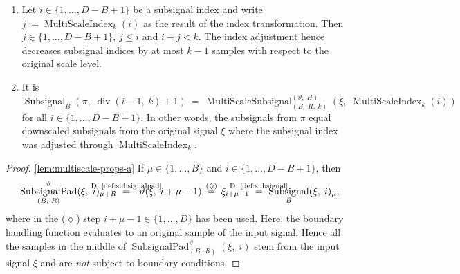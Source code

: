 \documentclass[journal]{IEEEtran}
\newcommand{\ROI}{B}
\newcommand{\discint}[2]{\{#1,\dotsc,#2\}}
\newcommand{\inint}[2]{\in\discint{#1}{#2}}
\DeclareMathOperator{\Subsignal}{Subsignal}
\renewcommand{\div}[2]{\operatorname{div}(#1,\ #2)}
\newcommand{\equsing}[1]{\overset{\mathclap{\text{#1}}}{=}}
\DeclareMathOperator{\SubsignalPad}{SubsignalPad}
\newcommand{\SubsignalPadROIParams}{\SubsignalPad_{(\ROI,\; R)}^{\vartheta}}
\DeclareMathOperator{\MultiScaleSubsignal}{MultiScaleSubsignal}
\newcommand{\MultiScaleSubsignalROIParams}{\MultiScaleSubsignal_{(\ROI,\; R,\; k)}^{(\vartheta,\; H)}}
\DeclareMathOperator{\MultiScaleIndex}{MultiScaleIndex}
\begin{document}
\begin{lemma}
\begin{enumerate}
  \item \label{lem:multiscale-props-c} Let $i\inint{1}{D - \ROI + 1}$ be a subsignal index and write $j := \MultiScaleIndex_k(i)$ as the result of the index transformation.
        Then $j\inint{1}{D - \ROI + 1}$, $j \leq i$ and $i - j < k$.
        The index adjustment hence decreases subsignal indices by at most $k - 1$ samples with respect to the original scale level.
  \item \label{lem:multiscale-props-d} It is
\begin{displaymath}
     \Subsignal_\ROI(\pi,\;\div{i - 1}{k} + 1)
  \ =\ \MultiScaleSubsignalROIParams(\xi,\;\MultiScaleIndex_k(i))
\end{displaymath} for all $i\inint{1}{D - \ROI + 1}$.
        In other words, the subsignals from $\pi$ equal downscaled subsignals from the original signal $\xi$ where the subsignal index was adjusted through $\MultiScaleIndex_k$.
\end{enumerate}
\end{lemma}\begin{proof}
\ref{lem:multiscale-props-a}
If $\mu\inint{1}{\ROI}$ and $i\inint{1}{D - \ROI + 1}$, then
\begin{displaymath}
  \SubsignalPadROIParams(\xi,\;i)_{\mu + R}
  \ \equsing{D.~\ref{def:subsignalpad}}\ \ \vartheta(\xi,\;i + \mu - 1)
  \ \equsing{($\lozenge$)}\ \xi_{i + \mu - 1}
  \ \equsing{D.~\ref{def:subsignal}}\ \Subsignal_\ROI(\xi,\;i)_\mu\text{,}
\end{displaymath}
where in the ($\lozenge$) step $i + \mu - 1\inint{1}{D}$ has been used.
Here, the boundary handling function evaluates to an original sample of the input signal.
Hence all the samples in the middle of $\SubsignalPadROIParams(\xi,\;i)$ stem from the input signal $\xi$ and are \emph{not} subject to boundary conditions.


\end{proof}
\end{document}
